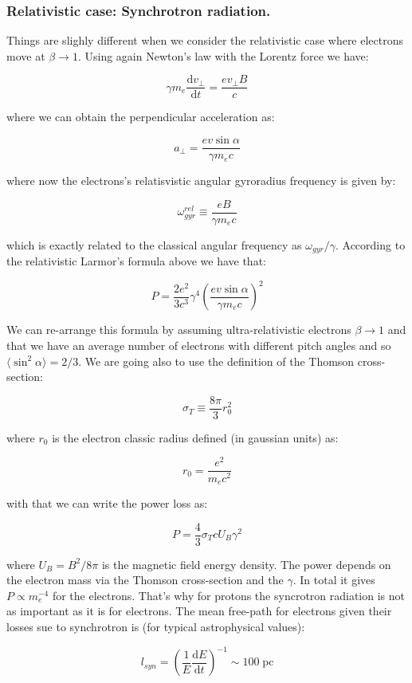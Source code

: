\documentclass[
  letterpaper,
  DIV=11,
  numbers=noendperiod]{scrreprt}
\begin{document}
\subsubsection{Relativistic case: Synchrotron
radiation.}\label{relativistic-case-synchrotron-radiation.}

Things are slighly different when we consider the relativistic case
where electrons move at \(\beta \rightarrow 1\). Using again Newton's
law with the Lorentz force we have:

\[\gamma m_e \frac{\mathrm{d} v_\perp}{\mathrm{d} t} = \frac{e v_\perp B}{c}\]

where we can obtain the perpendicular acceleration as:

\[a_\perp = \frac{e v\sin\alpha}{\gamma m_e c}\]

where now the electrons's relatisvistic angular gyroradius frequency is
given by:

\[\omega^{rel}_{gyr} \equiv \frac{eB}{\gamma m_e c}\]

which is exactly related to the classical angular frequency as
\(\omega_{gyr}/\gamma\). According to the relativistic Larmor's formula
above we have that:

\[P = \frac{2 e^2}{3c^3} \gamma^4 \left(\frac{e v\sin\alpha}{\gamma m_e c}\right)^2 \]

We can re-arrange this formula by assuming ultra-relativistic electrons
\(\beta \rightarrow 1\) and that we have an average number of electrons
with different pitch angles and so
\(\langle \sin^2 \alpha \rangle = 2/3\). We are going also to use the
definition of the Thomson cross-section:

\[\sigma_T \equiv \frac{8\pi}{3}r^2_0\]

where \(r_0\) is the electron classic radius defined (in gaussian units)
as:

\[r_0 = \frac{e^2}{m_e c^2} \]

with that we can write the power loss as:

\[P = \frac{4}{3} \sigma_T c U_B \gamma^2\]

where \(U_B = B^2/8\pi\) is the magnetic field energy density. The power
depends on the electron mass via the Thomson cross-section and the
\(\gamma\). In total it gives \(P\propto m_e^{-4}\) for the electrons.
That's why for protons the syncrotron radiation is not as important as
it is for electrons. The mean free-path for electrons given their losses
sue to synchrotron is (for typical astrophysical values):

\[l_{syn} = \left(\frac{1}{E}\frac{\mathrm{d}E}{\mathrm{d}t}\right)^{-1}  \sim 100 \mathrm{\;pc}\]
\end{document}
